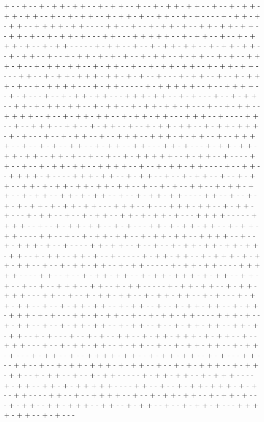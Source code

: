 + - - + - - + - + + - + + - - + - + + - - + - - + - + + - + + - - + - - + - + + - + + - + + - - + - - + - + + - - + - + + - + - - + + - - + - + - - - - + - + + - + - + + - - + + + + - + + - - - - + + - - + - - + - + + - + - - + + - + + - + + - - + + - + - - + - + + - + - - - + + - - - + + + + + - - + - + + - - + - - + - + + + - + - - + - + + - - - - - + - + + - - + - - + - + + - + + - - + - + + - + + - - + - + + - - + - - + - + + - + - + - + - - + - + + - - + - + + - - + - + - - + + + - + - - + - + + - + + - - + - + + - - + - - + - + + - + + - - + - + + - + + - - - - + + - - + - + + - + + + - + + - + - + - - + - - - + - + + - - + - - + - + + + - + - - + - + + + + - - - + - + + - - - - - + - + + + + + - - + - - + + + + - - + - + - - - + - - + - + + - + + - - - + + + - + + - - + - + - - - + - - + - + + - - + + - + - + + - + + - - + - + + - - + - + + - + + - + - - - + - - + - + + - - + + + + - - + - - + - + + - + + - - + - + + - + + - - - + + + - - + - - - - + + - - + - - + + + - - + + - - + - + + - - + - - + - + + - + + - - + - + + - + + + - + - + - - - + - - + - + + - - + - - + + + - - + + + - + - + + - - + - - + + + + - - + - - + - + - - + + - - + - + + - - + + - - - + + - + - - - + - + + - + + - + + - + + - - + + - + - - + - - + - - + - + + + + + - - + - + + - - + - - - - + + - - + - - + - + + - + + - - + + + + - - + - - + - + + - + + - - - - + - - + + - - + + + + - + - - - - + + + - + + - - + - + + - - + - - + - + + - - + - - + - + + - - + + - + - + + - + + - + + - + + - - + - - + - + - - + + - - + - + + - + + - - + - + + - - + + - + - + + - - + - - + - + + - + + - - - - + + - - + - - + - + - + - + + - + - + + - + + - - - + + + - - + - - - + + + - + + - - + - + + - + - - - + - + + - - + - - + - + + - - + + - + - + + - + - - - + + + + - - - - - + + + + - - + - - + - + + - + + - - + - + - - - + + - + - + + - + + - - + - + + - + + - - - - + + - - + - - + - + + - + + - - + - + + - + + - - + + + + - - + - - + - + + + - + - - + - - - - + + - + + - - + - - + - - + - + + - + + - + + - + + - + + - - + - + + - - + + - + - - + - - - - - + - + + - + + - - + - + + + - + - + + - + + - - + - - + - + + - + + - - + - + + - - - - - + - + + - + + - - - - + + + + + - - - - + + - - + - - + - + + - + + - - + - + + - + + + - + - + + - - + + - + - - + - - + - - + + + - - + + - - + - + + - - - - - + - + + - + + - - + - + + - + + + - - - + + - - + - - + - + + - + + - - + - + + - + + - - + - + - - - + - + + - + + - - + - - + - + + - + + - - + - + + - - + - - + - + + - + + - - + - + + - + + + - + - + - - - + + - + - + + - - + - - + - + + - + + - - - - + + + - + - - + - + + - - + - - + - + + - + + - - + - + + - - + - - + - + + - + + - - + + - + - + + - - + - + - - - + - - + - + - - + + - - + - + + - + + + - + - + + - - + - - + + + - - - + - - + - + + - + + - - + - + + - - + - - + - + + - + + - - + - + + - + - - - + - + + - - + - - + + + + - + + - - + - + + - + + - - + - + - - - + + - - - + + - - + - - + - + + - + + + - + - + + - - + - - + - + - + + + - - + - + + - + + - - + - + + - - + - - + - + + - - - - - + - + + - + + - - + - + + + - - - - + - + + - - + + - + - + + + + + - - - - + + - - + - - + - + + - + + + - + - + - - + + - - - - + + - - + - - + + + + - - + - - + - + + - + + - - + - + + - + - - - + - + + - - + + - + + + - - + + - - + - + + - - + - - + - + + - + - - - + + + + - + + - - + - + - - - 
